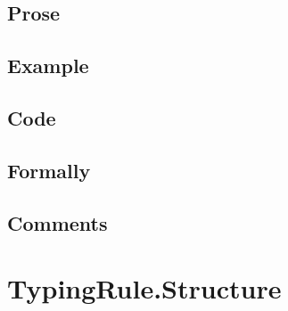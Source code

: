 \documentclass{book}
\begin{document}
    \subsection{Prose}

    \subsection{Example}

    \subsection{Code}

    \subsection{Formally}

    \subsection{Comments}

\section{TypingRule.Structure}
\end{document}
